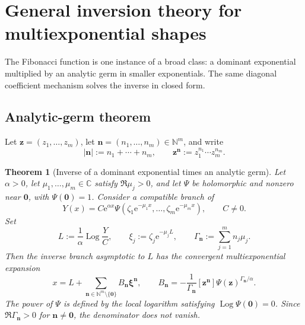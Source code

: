 \documentclass[11pt,oneside]{article}
\numberwithin{equation}{section}
\newtheorem{theorem}{Theorem}[section]
\newcommand{\Log}{\operatorname{Log}}
\newcommand{\e}{\mathrm{e}}
\newcommand{\NN}{\mathbb{N}}
\newcommand{\CC}{\mathbb{C}}
\newcommand{\vct}[1]{\boldsymbol{#1}}
\newcommand{\coeff}[2]{[#1]#2}
\begin{document}
\section{General inversion theory for multiexponential shapes}
\label{sec:general-theory}

The Fibonacci function is one instance of a broad class: a dominant exponential
multiplied by an analytic germ in smaller exponentials.  The same diagonal
coefficient mechanism solves the inverse in closed form.

\subsection{Analytic-germ theorem}

Let \(\vct z=(z_1,\ldots,z_m)\), let
\(\vct n=(n_1,\ldots,n_m)\in\NN^m\), and write
\begin{equation}
  |\vct n|:=n_1+\cdots+n_m,
  \qquad
  \vct z^{\vct n}:=z_1^{n_1}\cdots z_m^{n_m}.
\end{equation}

\begin{theorem}[Inverse of a dominant exponential times an analytic germ]
\label{thm:analytic-germ-inverse}
Let \(\alpha>0\), let \(\mu_1,\ldots,\mu_m\in\CC\) satisfy
\(\Re\mu_j>0\), and let \(\Psi\) be holomorphic and nonzero near
\(\vct0\), with \(\Psi(\vct0)=1\).  Consider a compatible branch of
\begin{equation}
  Y(x)=C\e^{\alpha x}
  \Psi\!\left(\zeta_1\e^{-\mu_1x},\ldots,
              \zeta_m\e^{-\mu_mx}\right),
  \qquad C\ne0.
  \label{eq:general-Y}
\end{equation}
Set
\begin{equation}
  L:=\frac1\alpha\Log\frac YC,
  \qquad
  \xi_j:=\zeta_j\e^{-\mu_jL},
  \qquad
  \Gamma_{\vct n}:=\sum_{j=1}^m n_j\mu_j.
  \label{eq:general-variables}
\end{equation}
Then the inverse branch asymptotic to \(L\) has the convergent multiexponential
expansion
\begin{equation}
  \boxed{
  x=L+\sum_{\vct n\in\NN^m\setminus\{\vct0\}}
       B_{\vct n}\vct\xi^{\vct n},
  \qquad
  B_{\vct n}=-\frac1{\Gamma_{\vct n}}
  \coeff{\vct z^{\vct n}}
  {\Psi(\vct z)^{\Gamma_{\vct n}/\alpha}}.
  }
  \label{eq:general-diagonal-formula}
\end{equation}
The power of \(\Psi\) is defined by the local logarithm satisfying
\(\Log\Psi(\vct0)=0\).  Since \(\Re\Gamma_{\vct n}>0\) for
\(\vct n\ne\vct0\), the denominator does not vanish.
\end{theorem}
\end{document}
